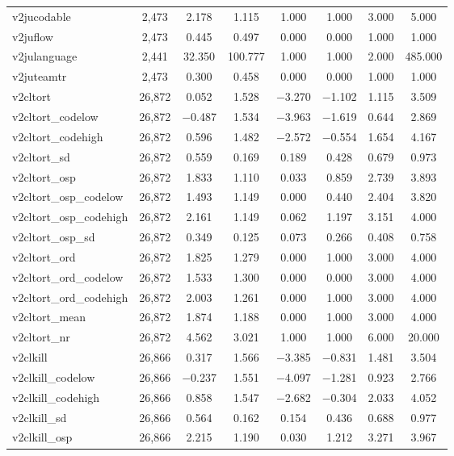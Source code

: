 \begin{table}[!htbp]
\begin{tabular}{@{\extracolsep{5pt}}lccccccc}
v2jucodable & 2,473 & 2.178 & 1.115 & 1.000 & 1.000 & 3.000 & 5.000 \\ 
v2juflow & 2,473 & 0.445 & 0.497 & 0.000 & 0.000 & 1.000 & 1.000 \\ 
v2julanguage & 2,441 & 32.350 & 100.777 & 1.000 & 1.000 & 2.000 & 485.000 \\ 
v2juteamtr & 2,473 & 0.300 & 0.458 & 0.000 & 0.000 & 1.000 & 1.000 \\ 
v2cltort & 26,872 & 0.052 & 1.528 & $-$3.270 & $-$1.102 & 1.115 & 3.509 \\ 
v2cltort\_codelow & 26,872 & $-$0.487 & 1.534 & $-$3.963 & $-$1.619 & 0.644 & 2.869 \\ 
v2cltort\_codehigh & 26,872 & 0.596 & 1.482 & $-$2.572 & $-$0.554 & 1.654 & 4.167 \\ 
v2cltort\_sd & 26,872 & 0.559 & 0.169 & 0.189 & 0.428 & 0.679 & 0.973 \\ 
v2cltort\_osp & 26,872 & 1.833 & 1.110 & 0.033 & 0.859 & 2.739 & 3.893 \\ 
v2cltort\_osp\_codelow & 26,872 & 1.493 & 1.149 & 0.000 & 0.440 & 2.404 & 3.820 \\ 
v2cltort\_osp\_codehigh & 26,872 & 2.161 & 1.149 & 0.062 & 1.197 & 3.151 & 4.000 \\ 
v2cltort\_osp\_sd & 26,872 & 0.349 & 0.125 & 0.073 & 0.266 & 0.408 & 0.758 \\ 
v2cltort\_ord & 26,872 & 1.825 & 1.279 & 0.000 & 1.000 & 3.000 & 4.000 \\ 
v2cltort\_ord\_codelow & 26,872 & 1.533 & 1.300 & 0.000 & 0.000 & 3.000 & 4.000 \\ 
v2cltort\_ord\_codehigh & 26,872 & 2.003 & 1.261 & 0.000 & 1.000 & 3.000 & 4.000 \\ 
v2cltort\_mean & 26,872 & 1.874 & 1.188 & 0.000 & 1.000 & 3.000 & 4.000 \\ 
v2cltort\_nr & 26,872 & 4.562 & 3.021 & 1.000 & 1.000 & 6.000 & 20.000 \\ 
v2clkill & 26,866 & 0.317 & 1.566 & $-$3.385 & $-$0.831 & 1.481 & 3.504 \\ 
v2clkill\_codelow & 26,866 & $-$0.237 & 1.551 & $-$4.097 & $-$1.281 & 0.923 & 2.766 \\ 
v2clkill\_codehigh & 26,866 & 0.858 & 1.547 & $-$2.682 & $-$0.304 & 2.033 & 4.052 \\ 
v2clkill\_sd & 26,866 & 0.564 & 0.162 & 0.154 & 0.436 & 0.688 & 0.977 \\ 
v2clkill\_osp & 26,866 & 2.215 & 1.190 & 0.030 & 1.212 & 3.271 & 3.967 \\ 

\end{tabular}
\end{table}
